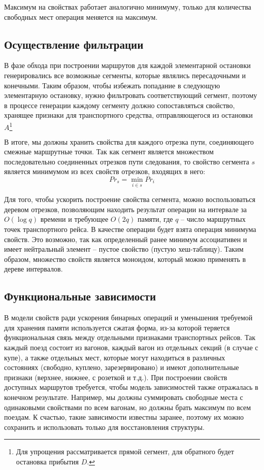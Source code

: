 Максимум на свойствах работает аналогично минимуму, только для количества свободных мест операция меняется на максимум.

\subsection{Осуществление фильтрации}
В фазе обхода при построении маршрутов для каждой элементарной остановки генерировались все возможные сегменты, которые являлись пересадочными и конечными. Таким образом, чтобы избежать попадание в следующую элементарную остановку, нужно фильтровать соответствующий сегмент, поэтому в процессе генерации каждому сегменту должно сопоставляться свойство, хранящее признаки для транспортного средства, отправляющегося из остановки $A$\footnote{Для упрощения рассматривается прямой сегмент, для обратного будет остановка прибытия $D$.}

В итоге, мы должны хранить свойства для каждого отрезка пути, соединяющего смежные маршрутные точки. Так как сегмент является множеством последовательно соединенных отрезков пути следования, то свойство сегмента $s$ является минимумом из всех свойств отрезков, входящих в него:
\[
Pr_s=\min_{i \in s}{Pr_i}
\]

Для того, чтобы ускорить построение свойства сегмента, можно воспользоваться деревом отрезков, позволяющим находить результат операции на интервале за $O(\log q)$ времени и требующее $O(2q)$ памяти, где $q$ -- число маршрутных точек транспортного рейса. В качестве операции будет взята операция минимума свойств. Это возможно, так как определенный ранее минимум ассоциативен и имеет нейтральный элемент -- пустое свойство (пустую хеш-таблицу). Таким образом, множество свойств является моноидом, который можно применять в дереве интервалов.

\subsection{Функциональные зависимости}
В модели свойств ради ускорения бинарных операций и уменьшения требуемой для хранения памяти используется сжатая форма, из-за которой теряется функциональная связь между отдельными признаками транспортных рейсов. Так каждый поезд состоит из вагонов, каждый вагон из отдельных секций (в случае с купе), а также отдельных мест, которые могут находиться в различных состояниях (свободно, куплено, зарезервировано) и имеют дополнительные признаки (верхнее, нижнее, с розеткой и т.д.). При построении свойств доступных маршрутов требуется, чтобы модель зависимостей также отражалась в конечном результате. Например, мы должны суммировать свободные места с одинаковыми свойствами по всем вагонам, но должны брать максимум по всем поездам. К счастью, такие зависимости известны заранее, поэтому их можно сохранить и использовать только для восстановления структуры.

